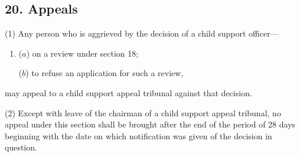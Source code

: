 \documentclass[12pt,a4paper]{article}
\begin{document}
%
%
%
%
%
%
%
%

\subsection{20. Appeals}

(1) Any person who is aggrieved by the decision of a child support officer—
\begin{enumerate}\item[]
($a$) on a review under section 18;

($b$) to refuse an application for such a review,
\end{enumerate}
may appeal to a child support appeal tribunal against that decision.

(2) Except with leave of the chairman of a child support appeal tribunal, no appeal under this section shall be brought after the end of the period of 28 days beginning with the date on which notification was given of the decision in question.
\end{document}
